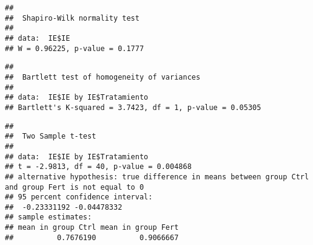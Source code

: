 \documentclass[
]{article}
\newenvironment{Shaded}{\begin{snugshade}}{\end{snugshade}}
\newcommand{\AttributeTok}[1]{\textcolor[rgb]{0.13,0.29,0.53}{#1}}
\newcommand{\CommentTok}[1]{\textcolor[rgb]{0.56,0.35,0.01}{\textit{#1}}}
\newcommand{\FloatTok}[1]{\textcolor[rgb]{0.00,0.00,0.81}{#1}}
\newcommand{\FunctionTok}[1]{\textcolor[rgb]{0.13,0.29,0.53}{\textbf{#1}}}
\newcommand{\NormalTok}[1]{#1}
\newcommand{\OtherTok}[1]{\textcolor[rgb]{0.56,0.35,0.01}{#1}}
\newcommand{\SpecialCharTok}[1]{\textcolor[rgb]{0.81,0.36,0.00}{\textbf{#1}}}
\newcommand{\StringTok}[1]{\textcolor[rgb]{0.31,0.60,0.02}{#1}}
\begin{document}
\begin{verbatim}
## 
##  Shapiro-Wilk normality test
## 
## data:  IE$IE
## W = 0.96225, p-value = 0.1777
\end{verbatim}

\begin{Shaded}
\end{Shaded}

\begin{verbatim}
## 
##  Bartlett test of homogeneity of variances
## 
## data:  IE$IE by IE$Tratamiento
## Bartlett's K-squared = 3.7423, df = 1, p-value = 0.05305
\end{verbatim}

\begin{Shaded}
\end{Shaded}

\begin{verbatim}
## 
##  Two Sample t-test
## 
## data:  IE$IE by IE$Tratamiento
## t = -2.9813, df = 40, p-value = 0.004868
## alternative hypothesis: true difference in means between group Ctrl and group Fert is not equal to 0
## 95 percent confidence interval:
##  -0.23331192 -0.04478332
## sample estimates:
## mean in group Ctrl mean in group Fert 
##          0.7676190          0.9066667
\end{verbatim}

\begin{Shaded}
\end{Shaded}
\end{document}
